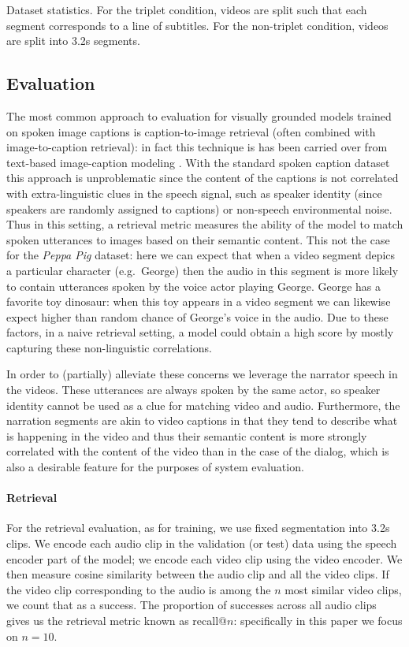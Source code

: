 \begin{table}
  \centering
  
  \caption{Dataset statistics. For the triplet condition, videos are
    split such that each segment corresponds to a line of
    subtitles. For the non-triplet condition, videos are split into
    3.2s segments.}
  \label{tab:ds-stat}
\end{table}


\subsection{Evaluation}
\label{sec:eval}
The most common approach to evaluation for visually grounded models
trained on spoken image captions is caption-to-image retrieval (often
combined with image-to-caption retrieval): in fact this technique is
has been carried over from text-based image-caption modeling
\citet{chrupala-visually-2021}.
 With the
standard spoken caption dataset this approach is unproblematic since
the content of the captions is not correlated with extra-linguistic
clues in the speech signal, such as speaker identity (since speakers
are randomly assigned to captions) or non-speech environmental
noise. Thus in this setting, a retrieval metric measures the ability of the
model to match spoken utterances to images based on their semantic
content. This not the case for the {\it Peppa Pig} dataset: here we
can expect that when a video segment depics a particular character
(e.g.\ George) then the audio in this segment is more likely to contain
utterances spoken by the voice actor playing George. George has a
favorite toy dinosaur: when this toy appears in a video segment we can
likewise expect higher than random chance of George's voice in the
audio. Due to these factors, in a naive retrieval setting, a model
could obtain a high score by mostly capturing these non-linguistic
correlations.

In order to (partially) alleviate these concerns we leverage the
narrator speech in the videos. These utterances are always spoken by
the same actor, so speaker identity cannot be used as a clue for
matching video and audio. Furthermore, the narration segments are akin
to video captions in that they tend to describe what is happening in
the video and thus their semantic content is more strongly
correlated with the content of the video than in the case of the
dialog, which is also a desirable feature for the purposes of system
evaluation.

\paragraph{Retrieval}
For the retrieval evaluation, as for training, we use fixed
segmentation into 3.2s clips. We encode each audio clip in the
validation (or test) data using the speech encoder part of the model;
we encode each video clip using the video encoder. We then measure
cosine similarity between the audio clip and all the video clips. If
the video clip corresponding to the audio is among the $n$ most
similar video clips, we count that as a success. The proportion of
successes across all audio clips gives us the retrieval metric known
as recall@$n$: specifically in this paper we focus on $n=10$.

